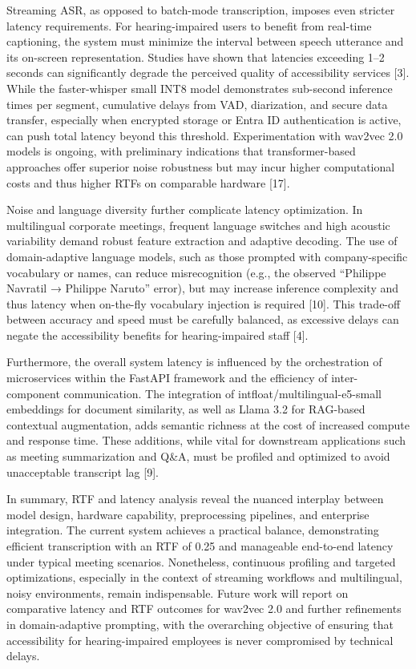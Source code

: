 \documentclass[12pt,a4paper]{article}
\begin{document}
Streaming ASR, as opposed to batch-mode transcription, imposes even stricter latency requirements. For hearing-impaired users to benefit from real-time captioning, the system must minimize the interval between speech utterance and its on-screen representation. Studies have shown that latencies exceeding 1–2 seconds can significantly degrade the perceived quality of accessibility services [3]. While the faster-whisper small INT8 model demonstrates sub-second inference times per segment, cumulative delays from VAD, diarization, and secure data transfer, especially when encrypted storage or Entra ID authentication is active, can push total latency beyond this threshold. Experimentation with wav2vec 2.0 models is ongoing, with preliminary indications that transformer-based approaches offer superior noise robustness but may incur higher computational costs and thus higher RTFs on comparable hardware [17].


Noise and language diversity further complicate latency optimization. In multilingual corporate meetings, frequent language switches and high acoustic variability demand robust feature extraction and adaptive decoding. The use of domain-adaptive language models, such as those prompted with company-specific vocabulary or names, can reduce misrecognition (e.g., the observed “Philippe Navratil → Philippe Naruto” error), but may increase inference complexity and thus latency when on-the-fly vocabulary injection is required [10]. This trade-off between accuracy and speed must be carefully balanced, as excessive delays can negate the accessibility benefits for hearing-impaired staff [4].


Furthermore, the overall system latency is influenced by the orchestration of microservices within the FastAPI framework and the efficiency of inter-component communication. The integration of intfloat/multilingual-e5-small embeddings for document similarity, as well as Llama 3.2 for RAG-based contextual augmentation, adds semantic richness at the cost of increased compute and response time. These additions, while vital for downstream applications such as meeting summarization and Q\&A, must be profiled and optimized to avoid unacceptable transcript lag [9].


In summary, RTF and latency analysis reveal the nuanced interplay between model design, hardware capability, preprocessing pipelines, and enterprise integration. The current system achieves a practical balance, demonstrating efficient transcription with an RTF of 0.25 and manageable end-to-end latency under typical meeting scenarios. Nonetheless, continuous profiling and targeted optimizations, especially in the context of streaming workflows and multilingual, noisy environments, remain indispensable. Future work will report on comparative latency and RTF outcomes for wav2vec 2.0 and further refinements in domain-adaptive prompting, with the overarching objective of ensuring that accessibility for hearing-impaired employees is never compromised by technical delays.
\end{document}
